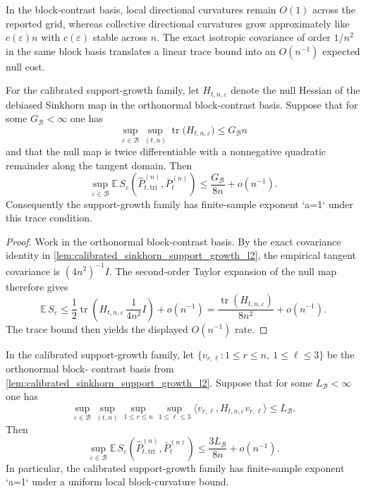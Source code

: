 \begin{remark}
\label{rem:sinkhorn_hessian_anisotropy}
In the block-contrast basis, local directional curvatures remain $O(1)$ across
the reported grid, whereas collective directional curvatures grow
approximately like $c(\varepsilon)n$ with $c(\varepsilon)$ stable across $n$.
The exact isotropic covariance of order $1/n^2$ in the same block basis
translates a linear trace bound into an $O(n^{-1})$ expected null cost.
\end{remark}

\begin{proposition}
\label{prop:covariance_weighted_support_growth}
For the calibrated support-growth family, let $H_{t,n,\varepsilon}$ denote the
null Hessian of the debiased Sinkhorn map in the orthonormal block-contrast
basis. Suppose that for some $G_{\mathcal B}<\infty$ one has
\[
  \sup_{\varepsilon\in\mathcal B}\sup_{(t,n)}
  \operatorname{tr}\bigl(H_{t,n,\varepsilon}\bigr)
  \le G_{\mathcal B} n
\]
and that the null map is twice differentiable with a nonnegative quadratic
remainder along the tangent domain. Then
\[
  \sup_{\varepsilon\in\mathcal B}
  \mathbb E\,S_{\varepsilon}\!\left(\widehat P_{t,\mathrm{tri}}^{(n)},\bar P_t^{(n)}\right)
  \le \frac{G_{\mathcal B}}{8n} + o(n^{-1}).
\]
Consequently the support-growth family has finite-sample exponent `a=1` under
this trace condition.
\end{proposition}

\begin{proof}
Work in the orthonormal block-contrast basis. By the exact covariance identity in
\cref{lem:calibrated_sinkhorn_support_growth_l2}, the empirical tangent
covariance is $(4n^2)^{-1}I$. The second-order Taylor expansion of the null map
therefore gives
\[
  \mathbb E\,S_{\varepsilon}
  \le \frac12\operatorname{tr}\!
  \left(H_{t,n,\varepsilon}\,\frac{1}{4n^2}I\right)
  + o(n^{-1})
  = \frac{\operatorname{tr}(H_{t,n,\varepsilon})}{8n^2}+o(n^{-1}).
\]
The trace bound then yields the displayed $O(n^{-1})$ rate.
\end{proof}

\begin{corollary}
\label{cor:local_block_curvature_support_growth}
In the calibrated support-growth family, let
$\{v_{r,\ell}:1\le r\le n,\ 1\le \ell\le 3\}$ be the orthonormal block-
contrast basis from \cref{lem:calibrated_sinkhorn_support_growth_l2}. Suppose
that for some $L_{\mathcal B}<\infty$ one has
\[
  \sup_{\varepsilon\in\mathcal B}\sup_{(t,n)}\sup_{1\le r\le n}\sup_{1\le \ell\le 3}
  \langle v_{r,\ell}, H_{t,n,\varepsilon} v_{r,\ell}\rangle
  \le L_{\mathcal B}.
\]
Then
\[
  \sup_{\varepsilon\in\mathcal B}
  \mathbb E\,S_{\varepsilon}\!\left(\widehat P_{t,\mathrm{tri}}^{(n)},\bar P_t^{(n)}\right)
  \le \frac{3L_{\mathcal B}}{8n} + o(n^{-1}).
\]
In particular, the calibrated support-growth family has finite-sample exponent
`a=1` under a uniform local block-curvature bound.
\end{corollary}

